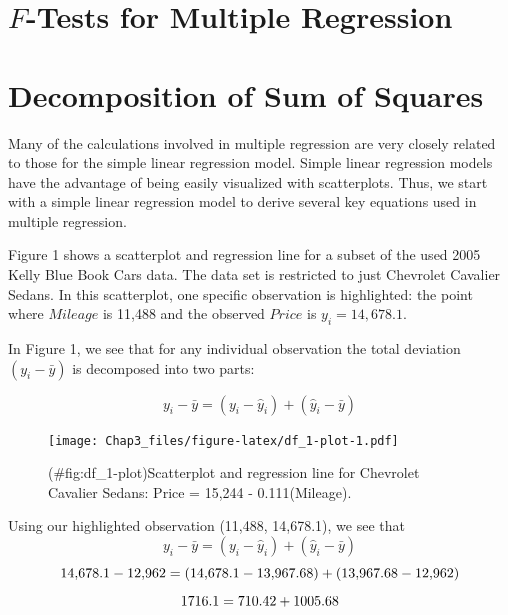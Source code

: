 \documentclass[
]{report}
\begin{document}
\section{\texorpdfstring{\textbf{\(F\)-Tests for Multiple Regression}}{F-Tests for Multiple Regression}}\label{f-tests-for-multiple-regression}

\section*{Decomposition of Sum of Squares}\label{decomposition-of-sum-of-squares}

Many of the calculations involved in multiple regression are very closely related to those for the simple linear regression model. Simple linear regression models have the advantage of being easily visualized with scatterplots. Thus, we start with a simple linear regression model to derive several key equations used in multiple regression.

Figure 1 shows a scatterplot and regression line for a subset of the used 2005 Kelly Blue Book Cars data. The data set is restricted to just Chevrolet Cavalier Sedans. In this scatterplot, one specific observation is highlighted: the point where \(Mileage\) is 11,488 and the observed \(Price\) is \(y_i = 14{,}678.1\).

In Figure 1, we see that for any individual observation the total deviation \((y_i - \bar{y})\) is decomposed into two parts:

\begin{equation}
y_i - \bar{y} = (y_i - \hat{y}_i) + (\hat{y}_i - \bar{y})
\tag{3.7}
\end{equation}

\begin{figure}
\centering
\texttt{[image: Chap3\_files/figure-latex/df\_1-plot-1.pdf]}
\caption{(\#fig:df\_1-plot)Scatterplot and regression line for Chevrolet Cavalier Sedans: Price = 15,244 - 0.111(Mileage).}
\end{figure}

Using our highlighted observation (11,488, 14,678.1), we see that
\begin{equation}\label{3.7}
y_i - \bar{y} = (y_i - \hat{y}_i) + (\hat{y}_i - \bar{y}) 
\tag{3.7}
\end{equation}
\begin{equation}
14{,}678.1 - 12{,}962 = (14{,}678.1 - 13{,}967.68) + (13{,}967.68 - 12{,}962) \notag
\end{equation}
\begin{equation}
1716.1 = 710.42 + 1005.68 \notag
\end{equation}
\end{document}
